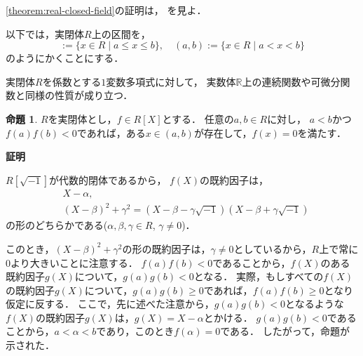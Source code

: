 \documentclass[uplatex, dvipdfmx]{jsarticle}
\makeatletter
\numberwithin{equation}{section}
\renewenvironment{proof}[1][\proofname]{\par
  \pushQED{\qed}%
  \normalfont \topsep6\p@\@plus6\p@\relax
  \trivlist
  \item\relax
  {\bfseries
  #1\@addpunct{.}}\hspace\labelsep\ignorespaces
}{
  \popQED\endtrivlist\@endpefalse
}
\newcommand{\R}{\mathbb{R}}
\theoremstyle{definition}
\newtheorem{proposition}[definition]{命題}
\renewcommand{\proofname}{\textbf{証明}}
\makeatother
\begin{document}
\cref{theorem:real-closed-field}の証明は，
\cite[Theorem 1.2.2.]{MR1659509}を見よ．

以下では，実閉体$R$上の区間を，
\begin{equation}
     [a,b]:=\{x \in R \mid a \leq x \leq b\}, \quad (a,b):=\{x \in R \mid a < x < b\}
\end{equation}
のようにかくことにする．

実閉体$R$を係数とする$1$変数多項式に対して，
実数体$\R$上の連続関数や可微分関数と同様の性質が成り立つ．

\begin{proposition}\label{proposition:intermediate}
     $R$を実閉体とし，$f \in R[X]$とする．
     任意の$a,b \in R$に対し，
     $a < b$かつ
     $f(a)f(b)<0$であれば，ある$x \in (a,b)$が存在して，$f(x)=0$を満たす．
\end{proposition}
\begin{proof}
     $R[\sqrt{-1}]$が代数的閉体であるから，
     $f(X)$の既約因子は，
     \begin{align}
          &X-\alpha, \\
          &(X-\beta)^2 + \gamma^2 = (X-\beta-\gamma\sqrt{-1})(X-\beta+\gamma\sqrt{-1})
     \end{align}
     の形のどちらかである($\alpha, \beta, \gamma \in R$, $\gamma \neq 0$)．

     このとき，$(X-\beta)^2 + \gamma^2$の形の既約因子は，$\gamma \neq 0$としているから，$R$上で常に$0$より大きいことに注意する．
     $f(a)f(b)<0$であることから，$f(X)$のある既約因子$g(X)$について，$g(a)g(b)<0$となる．
     実際，もしすべての$f(X)$の既約因子$g(X)$について，$g(a)g(b) \geq 0$であれば，$f(a)f(b)\geq0$となり仮定に反する．
     ここで，先に述べた注意から，$g(a)g(b)<0$となるような$f(X)$の既約因子$g(X)$は，$g(X) = X - \alpha$とかける．
     $g(a)g(b) < 0$であることから，$a<\alpha<b$であり，このとき$f(\alpha)=0$である．
     したがって，命題が示された．
\end{proof}
\end{document}
